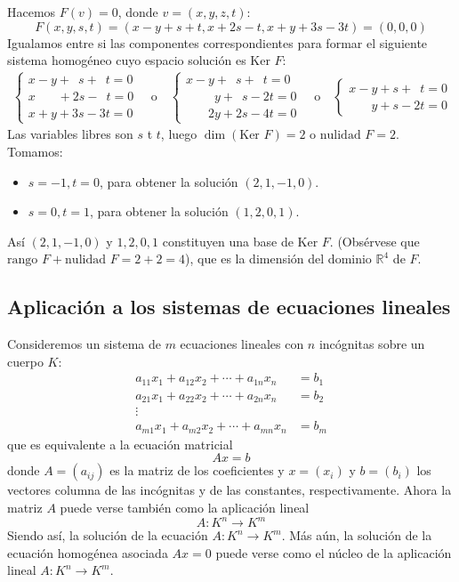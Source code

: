 \begin{enumerate}[label=\alph*.]
  Hacemos \(F(v)=0\), donde \(v=(x,y,z,t)\):
  \[
    F(x,y,s,t) = (x-y+s+t, x+2s-t, x+y+3s-3t) = (0,0,0)
  \]
  Igualamos entre si las componentes correspondientes para formar el siguiente sistema homogéneo cuyo espacio solución es \(\text{Ker } F\):
  \begin{align*}
    \begin{cases}
      x - y + \phantom{1}s + \phantom{1}t = 0 \\
      x \phantom{+ 1y } + 2s - \phantom{1}t = 0 \\
      x + y + 3s - 3t = 0
    \end{cases} \quad \text{o} \quad \begin{cases}
      x - y + \phantom{1}s + \phantom{1}t = 0 \\
      \phantom{x +} \phantom{1}y + \phantom{1}s - 2t = 0 \\
      \phantom{x +} 2y + 2s - 4t = 0
    \end{cases} \quad \text{o} \quad \begin{cases}
      x-y+s+\phantom{1}t=0\\
      \phantom{x+} y+s-2t = 0
    \end{cases}
  \end{align*}
  Las variables libres son \(s\) t \(t\), luego \(\dim(\text{Ker } F)=2\) o \(\text{nulidad } F =2\). Tomamos:
  \begin{itemize}
    \item \(s=-1,t=0\), para obtener la solución \((2,1,-1,0)\).
    \item \(s=0,t=1\), para obtener la solución \((1,2,0,1)\).
  \end{itemize}
  Así \((2,1,-1,0)\) y \(1,2,0,1\) constituyen una base de \(\text{Ker } F\). (Obsérvese que \(\text{rango } F + \text{nulidad } F = 2 + 2 = 4\)), que es la dimensión del dominio \(\mathbb{R}^4\) de \(F\).
\end{enumerate}

\subsection{Aplicación a los sistemas de ecuaciones lineales}

Consideremos un sistema de \(m\) ecuaciones lineales con \(n\) incógnitas sobre un cuerpo \(K\):
\begin{align*}
  a_{11} x_1 + a_{12} x_2 + \cdots + a_{1n} x_n &= b_1 \\
  a_{21} x_1 + a_{22} x_2 + \cdots + a_{2n} x_n &= b_2\\
  \vdots  \qquad \qquad ~ & \\
  a_{m1} x_1 + a_{m2} x_2 + \cdots + a_{mn} x_n &= b_m
\end{align*}
que es equivalente a la ecuación matricial
\[
  Ax=b
\]
donde \(A=(a_{ij})\) es la matriz de los coeficientes y \(x=(x_i)\) y \(b=(b_i)\) los vectores columna de las incógnitas y de las constantes, respectivamente. Ahora la matriz \(A\) puede verse también como la aplicación lineal 
\[
  A:K^n \rightarrow K^m
\]
Siendo así, la solución de la ecuación \(A:K^n \rightarrow K^m\). Más aún, la solución de la ecuación homogénea asociada \(Ax=0\) puede verse como el núcleo de la aplicación lineal \(A:K^n \rightarrow K^m\).

